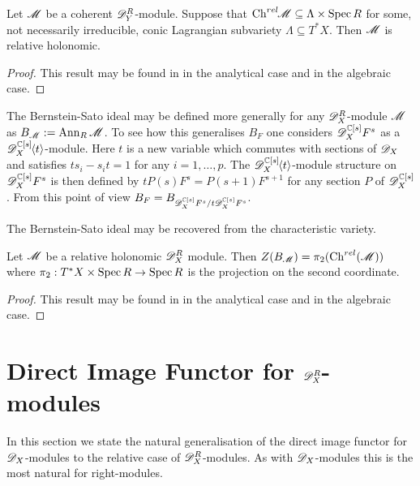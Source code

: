 \begin{lemma}\label{lem: InclusionCharVar}
  Let $\mathscr{M}$ be a coherent $\mathscr{D}_Y^R$-module. Suppose that $\operatorname{Ch}^{rel}\mkern-5mu \mathscr{M} \subseteq \Lambda \times \operatorname{Spec} R$ for some, not necessarily irreducible, conic Lagrangian subvariety $\Lambda\subseteq T^*X$. Then $\mathscr{M}$ is relative holonomic.
\end{lemma}
\begin{proof}
  This result may be found in \cite{maisonobe2016filtration} in the analytical case and \cite{budur2019zero} in the algebraic case.
\end{proof}
The Bernstein-Sato ideal may be defined more generally for any $\mathscr{D}_X^R$-module $\mathscr{M}$ as $B_{\mathscr{M}} := \operatorname{Ann}_{R}\mathscr{M}$. To see how this generalises $B_F$ one considers $\mathscr{D}_X^{\mathbb{C}[s]} F^s$ as a $\mathscr{D}_{X}^{\mathbb{C}[s]}\mkern-5mu\left\langle t \right\rangle$-module.
Here $t$ is a new variable which commutes with sections of $\mathscr{D}_X$ and satisfies $ts_i - s_it = 1$ for any $i=1,\ldots,
p$.  The $\mathscr{D}_{X}^{\mathbb{C}[s]}\mkern-5mu\left\langle t \right\rangle$-module structure on $\mathscr{D}_X^{\mathbb{C}[s]} F^s$ is then defined by $tP(s)F^s = P(s+1)F^{s + 1}$ for any section $P$ of $\mathscr{D}_X^{\mathbb{C}[s]}$. From this point of view $B_F = B_{\mathscr{D}_X^{\mathbb{C}[s]} F^s / t\mathscr{D}_X^{\mathbb{C}[s]} F^s}$.

The Bernstein-Sato ideal may be recovered from the characteristic variety.
\begin{proposition}\label{prop: ProjectionBernsteinSatoRelativeChar}
  Let $\mathscr{M}$ be a relative holonomic $\mathscr{D}_X^R$ module. Then  $Z(B_{\mathscr{M}}) = \pi_2(\operatorname{Ch}^{rel}(\mathscr{M}))$ where $\pi_2:T^*X\times \operatorname{Spec} R \to \operatorname{Spec} R$ is the projection on the second coordinate.
\end{proposition}
\begin{proof}
  This result may be found in \cite{maisonobe2016filtration} in the analytical case and \cite{budur2019zero} in the algebraic case.
\end{proof}
\section{Direct Image Functor for $\mathscr{D}_X^R$-modules}\label{sec: DirectImage}
    In this section we state the natural generalisation of the direct image functor for $\mathscr{D}_X$-modules to the relative case of $\mathscr{D}_X^R$-modules. As with $\mathscr{D}_X$-modules this is the most natural for right-modules.


